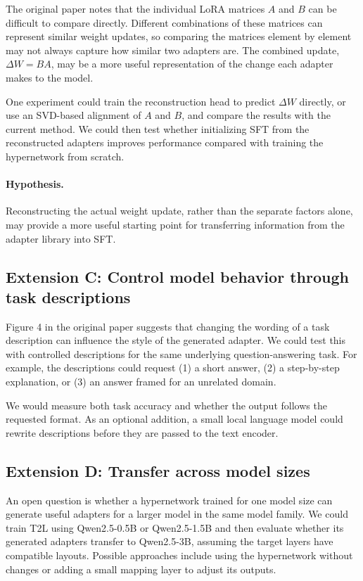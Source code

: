 \documentclass{article}
\begin{document}
The original paper notes that the individual LoRA matrices $A$ and $B$ can be difficult to compare directly. Different combinations of these matrices can represent similar weight updates, so comparing the matrices element by element may not always capture how similar two adapters are. The combined update, $\Delta W=BA$, may be a more useful representation of the change each adapter makes to the model.

One experiment could train the reconstruction head to predict $\Delta W$ directly, or use an SVD-based alignment of $A$ and $B$, and compare the results with the current method. We could then test whether initializing SFT from the reconstructed adapters improves performance compared with training the hypernetwork from scratch.

\paragraph{Hypothesis.}
Reconstructing the actual weight update, rather than the separate factors alone, may provide a more useful starting point for transferring information from the adapter library into SFT.

\subsection{Extension C: Control model behavior through task descriptions}

Figure 4 in the original paper suggests that changing the wording of a task description can influence the style of the generated adapter. We could test this with controlled descriptions for the same underlying question-answering task. For example, the descriptions could request (1) a short answer, (2) a step-by-step explanation, or (3) an answer framed for an unrelated domain.

We would measure both task accuracy and whether the output follows the requested format. As an optional addition, a small local language model could rewrite descriptions before they are passed to the text encoder.

\subsection{Extension D: Transfer across model sizes}

An open question is whether a hypernetwork trained for one model size can generate useful adapters for a larger model in the same model family. We could train T2L using Qwen2.5-0.5B or Qwen2.5-1.5B and then evaluate whether its generated adapters transfer to Qwen2.5-3B, assuming the target layers have compatible layouts. Possible approaches include using the hypernetwork without changes or adding a small mapping layer to adjust its outputs.
\end{document}
